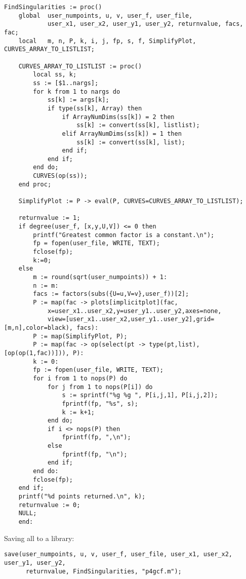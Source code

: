 \documentclass[a4paper,10pt]{article}
\begin{document}
\begin{lstlisting}[name=p4gcf]
FindSingularities := proc()
    global  user_numpoints, u, v, user_f, user_file,
            user_x1, user_x2, user_y1, user_y2, returnvalue, facs, fac;
    local   m, n, P, k, i, j, fp, s, f, SimplifyPlot, CURVES_ARRAY_TO_LISTLIST;

    CURVES_ARRAY_TO_LISTLIST := proc()
        local ss, k;
        ss := [$1..nargs];
        for k from 1 to nargs do
            ss[k] := args[k];
            if type(ss[k], Array) then
                if ArrayNumDims(ss[k]) = 2 then
                    ss[k] := convert(ss[k], listlist);
                elif ArrayNumDims(ss[k]) = 1 then
                    ss[k] := convert(ss[k], list);
                end if;
            end if;
        end do;
        CURVES(op(ss));
    end proc;
    
    SimplifyPlot := P -> eval(P, CURVES=CURVES_ARRAY_TO_LISTLIST);
    
    returnvalue := 1;
    if degree(user_f, [x,y,U,V]) <= 0 then
        printf("Greatest common factor is a constant.\n");
        fp = fopen(user_file, WRITE, TEXT);
        fclose(fp);
        k:=0;
    else
        m := round(sqrt(user_numpoints)) + 1:
        n := m:
        facs := factors(subs({U=u,V=v},user_f))[2];
        P := map(fac -> plots[implicitplot](fac,
            x=user_x1..user_x2,y=user_y1..user_y2,axes=none,
            view=[user_x1..user_x2,user_y1..user_y2],grid=[m,n],color=black), facs):
        P := map(SimplifyPlot, P);
        P := map(fac -> op(select(pt -> type(pt,list), [op(op(1,fac))])), P):
        k := 0:
        fp := fopen(user_file, WRITE, TEXT);
        for i from 1 to nops(P) do
            for j from 1 to nops(P[i]) do
                s := sprintf("%g %g ", P[i,j,1], P[i,j,2]);
                fprintf(fp, "%s", s);
                k := k+1;
            end do;
            if i <> nops(P) then
                fprintf(fp, ",\n");
            else
                fprintf(fp, "\n");
            end if;
        end do:
        fclose(fp);
    end if;
    printf("%d points returned.\n", k);
    returnvalue := 0;
    NULL;
    end:
\end{lstlisting}

Saving all to a library:

\begin{lstlisting}[name=p4gcf]
save(user_numpoints, u, v, user_f, user_file, user_x1, user_x2, user_y1, user_y2,
      returnvalue, FindSingularities, "p4gcf.m");
\end{lstlisting}
\end{document}
